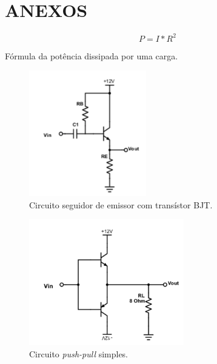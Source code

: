 \section*{ANEXOS}

    \begin{eqfloat}[h!]
        \begin{equation}
            P = I * R^{2}
            \label{eq:ganho_tensao}
        \end{equation}
        \caption{Fórmula da potência dissipada por uma carga.}
    \end{eqfloat}
    
    
    \begin{figure}[h!]
        \centering
        \includegraphics[height=5.5cm]{imgSource/circuitolab4.png}
        \caption{Circuito seguidor de emissor com transístor BJT.}
        \label{fig:circLab4}
    \end{figure}
    
    \begin{figure}[h!]
        \centering
        \includegraphics[height=5.5cm]{imgSource/pushPullSimp.png}
        \caption{Circuito \emph{push-pull} simples.}
        \label{fig:pushSimp}
    \end{figure}
    

